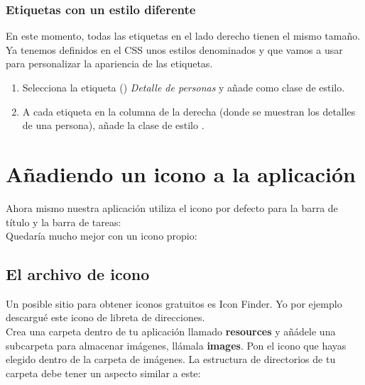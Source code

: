 \subsubsection*{Etiquetas con un estilo diferente}
En este momento, todas las etiquetas en el lado derecho tienen el mismo tamaño. 
Ya tenemos definidos en el CSS unos estilos denominados  y  
que vamos a usar para personalizar la apariencia de las etiquetas.
\begin{enumerate}
    \item Selecciona la etiqueta () \textit{Detalle de personas} y añade  
    como clase de estilo.
    \item A cada etiqueta en la columna de la derecha (donde se muestran los detalles 
    de una persona), añade la clase de estilo .
\end{enumerate}

\section{Añadiendo un icono a la aplicación}
Ahora mismo nuestra aplicación utiliza el icono por defecto para la barra de título y la barra de tareas:\\
Quedaría mucho mejor con un icono propio:\\
\subsection{El archivo de icono}
Un posible sitio para obtener iconos gratuitos es Icon Finder. %
Yo por ejemplo descargué este icono de libreta de direcciones.\\
Crea una carpeta dentro de tu aplicación llamado \textbf{resources} y añádele una subcarpeta 
para almacenar imágenes, llámala \textbf{images}. Pon el icono que hayas elegido dentro de la 
carpeta de imágenes. La estructura de directorios de tu carpeta debe tener un aspecto similar a este:
